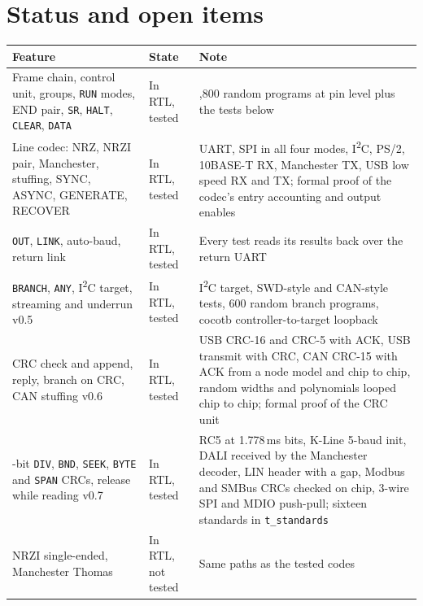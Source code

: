 \documentclass[11pt,a4paper]{article}
\newcommand{\vfive}{\textcolor{fivec}{\textsf{\small v0.5}}}
\newcommand{\vsix}{\textcolor{sixc}{\textsf{\small v0.6}}}
\newcommand{\vseven}{\textcolor{sevenc}{\textsf{\small v0.7}}}
\newcommand{\sig}[1]{\texttt{#1}}
\begin{document}
\section{Status and open items}

\begin{center}
\begin{tabularx}{\linewidth}{@{}>{\raggedright\arraybackslash}p{5.6cm} l >{\raggedright\arraybackslash}X@{}}
\toprule
Feature & State & Note \\
\midrule
Frame chain, control unit, groups, \sig{RUN} modes, END pair, \sig{SR}, \sig{HALT}, \sig{CLEAR}, \sig{DATA} & In RTL, tested & 1,800 random programs at pin level plus the tests below \\
Line codec: NRZ, NRZI pair, Manchester, stuffing, SYNC, ASYNC, GENERATE, RECOVER & In RTL, tested & UART, SPI in all four modes, I\textsuperscript{2}C, PS/2, 10BASE-T RX, Manchester TX, USB low speed RX and TX; formal proof of the codec's entry accounting and output enables \\
\sig{OUT}, \sig{LINK}, auto-baud, return link & In RTL, tested & Every test reads its results back over the return UART \\
\sig{BRANCH}, \sig{ANY}, I\textsuperscript{2}C target, streaming and underrun \vfive & In RTL, tested & I\textsuperscript{2}C target, SWD-style and CAN-style tests, 600 random branch programs, cocotb controller-to-target loopback \\
CRC check and append, reply, branch on CRC, CAN stuffing \vsix & In RTL, tested & USB CRC-16 and CRC-5 with ACK, USB transmit with CRC, CAN CRC-15 with ACK from a node model and chip to chip, random widths and polynomials looped chip to chip; formal proof of the CRC unit \\
22-bit \sig{DIV}, \sig{BND}, \sig{SEEK}, \sig{BYTE} and \sig{SPAN} CRCs, release while reading \vseven & In RTL, tested & RC5 at 1.778\,ms bits, K-Line 5-baud init, DALI received by the Manchester decoder, LIN header with a gap, Modbus and SMBus CRCs checked on chip, 3-wire SPI and MDIO push-pull; sixteen standards in \sig{t\_standards} \\
NRZI single-ended, Manchester Thomas & In RTL, not tested & Same paths as the tested codes \\
\bottomrule
\end{tabularx}
\end{center}
\end{document}
